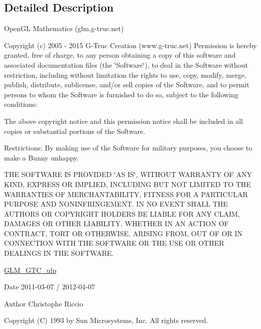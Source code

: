 \begin{DoxyCompactItemize}
\end{DoxyCompactItemize}


\subsection{Detailed Description}
Open\-G\-L Mathematics (glm.\-g-\/truc.\-net)

Copyright (c) 2005 -\/ 2015 G-\/\-Truc Creation (www.\-g-\/truc.\-net) Permission is hereby granted, free of charge, to any person obtaining a copy of this software and associated documentation files (the \char`\"{}\-Software\char`\"{}), to deal in the Software without restriction, including without limitation the rights to use, copy, modify, merge, publish, distribute, sublicense, and/or sell copies of the Software, and to permit persons to whom the Software is furnished to do so, subject to the following conditions\-:

The above copyright notice and this permission notice shall be included in all copies or substantial portions of the Software.

Restrictions\-: By making use of the Software for military purposes, you choose to make a Bunny unhappy.

T\-H\-E S\-O\-F\-T\-W\-A\-R\-E I\-S P\-R\-O\-V\-I\-D\-E\-D \char`\"{}\-A\-S I\-S\char`\"{}, W\-I\-T\-H\-O\-U\-T W\-A\-R\-R\-A\-N\-T\-Y O\-F A\-N\-Y K\-I\-N\-D, E\-X\-P\-R\-E\-S\-S O\-R I\-M\-P\-L\-I\-E\-D, I\-N\-C\-L\-U\-D\-I\-N\-G B\-U\-T N\-O\-T L\-I\-M\-I\-T\-E\-D T\-O T\-H\-E W\-A\-R\-R\-A\-N\-T\-I\-E\-S O\-F M\-E\-R\-C\-H\-A\-N\-T\-A\-B\-I\-L\-I\-T\-Y, F\-I\-T\-N\-E\-S\-S F\-O\-R A P\-A\-R\-T\-I\-C\-U\-L\-A\-R P\-U\-R\-P\-O\-S\-E A\-N\-D N\-O\-N\-I\-N\-F\-R\-I\-N\-G\-E\-M\-E\-N\-T. I\-N N\-O E\-V\-E\-N\-T S\-H\-A\-L\-L T\-H\-E A\-U\-T\-H\-O\-R\-S O\-R C\-O\-P\-Y\-R\-I\-G\-H\-T H\-O\-L\-D\-E\-R\-S B\-E L\-I\-A\-B\-L\-E F\-O\-R A\-N\-Y C\-L\-A\-I\-M, D\-A\-M\-A\-G\-E\-S O\-R O\-T\-H\-E\-R L\-I\-A\-B\-I\-L\-I\-T\-Y, W\-H\-E\-T\-H\-E\-R I\-N A\-N A\-C\-T\-I\-O\-N O\-F C\-O\-N\-T\-R\-A\-C\-T, T\-O\-R\-T O\-R O\-T\-H\-E\-R\-W\-I\-S\-E, A\-R\-I\-S\-I\-N\-G F\-R\-O\-M, O\-U\-T O\-F O\-R I\-N C\-O\-N\-N\-E\-C\-T\-I\-O\-N W\-I\-T\-H T\-H\-E S\-O\-F\-T\-W\-A\-R\-E O\-R T\-H\-E U\-S\-E O\-R O\-T\-H\-E\-R D\-E\-A\-L\-I\-N\-G\-S I\-N T\-H\-E S\-O\-F\-T\-W\-A\-R\-E.

\hyperlink{group__gtc__ulp}{G\-L\-M\-\_\-\-G\-T\-C\-\_\-ulp}

\begin{DoxyDate}{Date}
2011-\/03-\/07 / 2012-\/04-\/07 
\end{DoxyDate}
\begin{DoxyAuthor}{Author}
Christophe Riccio
\end{DoxyAuthor}
Copyright (C) 1993 by Sun Microsystems, Inc. All rights reserved.

